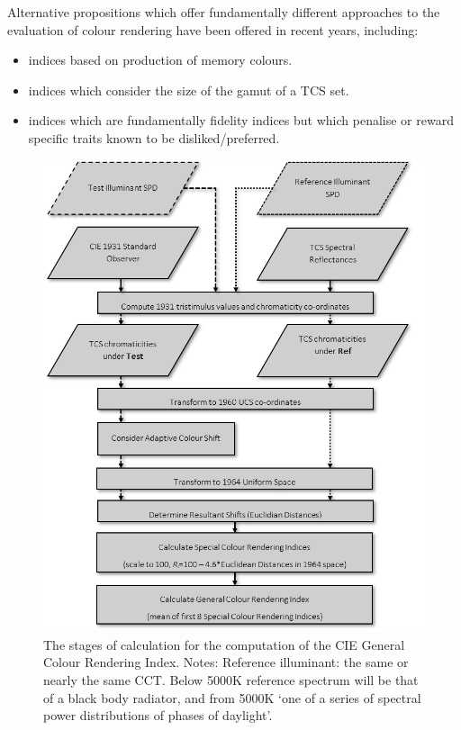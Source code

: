 Alternative propositions which offer fundamentally different approaches to the evaluation of colour rendering have been offered in recent years, including: 
\begin{itemize}
\item indices based on production of memory colours\citep{smet_memory_2012}.
\item indices which consider the size of the gamut of a TCS set\citep{rea_color_2008,teunissen_characterising_2016}.
\item indices which are fundamentally fidelity indices but which penalise or reward specific traits known to be disliked/preferred\citep{ohno_rationale_2010}.
\end{itemize}

\begin{figure}[htbp]
\includegraphics[max width=\textwidth]{figs/LitRev/criflow.png}
\caption{The stages of calculation for the computation of the CIE General Colour Rendering Index. Notes: Reference illuminant: the same or nearly the same \gls{CCT}. Below 5000K reference spectrum will be that of a black body radiator, and from 5000K `one of a series of spectral power distributions of phases of daylight'.}
\label{fig:criflow}
\end{figure}


